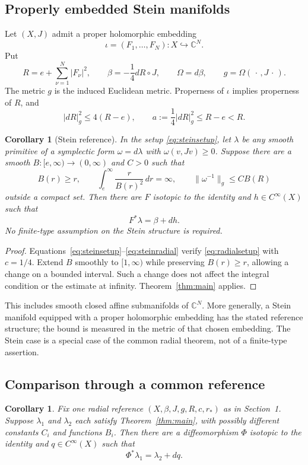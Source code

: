 \documentclass[11pt,a4paper]{article}
\newtheorem{corollary}[theorem]{Corollary}
\theoremstyle{remark}
\newcommand{\C}{\mathbb C}
\newcommand{\abs}[1]{\lvert #1\rvert}
\newcommand{\norm}[1]{\lVert #1\rVert}
\numberwithin{equation}{section}
\begin{document}
\subsection{Properly embedded Stein manifolds}
Let $(X,J)$ admit a proper holomorphic embedding
\[
\iota=(F_1,\ldots,F_N):X\hookrightarrow\C^N.
\]
Put
\begin{equation}\label{eq:steinsetup}
R=e+\sum_{\nu=1}^N\abs{F_\nu}^2,\qquad
\beta=-\frac14dR\circ J,
\qquad \Omega=d\beta,\qquad g=\Omega(\,\cdot\,,J\,\cdot\,).
\end{equation}
The metric $g$ is the induced Euclidean metric. Properness of $\iota$ implies properness of $R$, and
\begin{equation}\label{eq:steinradial}
\abs{dR}_g^2\le4(R-e),\qquad
a:=\frac14\abs{dR}_g^2\le R-e<R.
\end{equation}

\begin{corollary}[Stein reference]\label{cor:stein}
In the setup \eqref{eq:steinsetup}, let $\lambda$ be any smooth primitive of a symplectic form $\omega=d\lambda$ with $\omega(v,Jv)\ge0$. Suppose there are a smooth $B:[e,\infty)\to(0,\infty)$ and $C>0$ such that
\[
B(r)\ge r,\qquad
\int_e^\infty\frac{r}{B(r)^2}\,dr=\infty,
\qquad \norm{\omega^{-1}}_g\le C B(R)
\]
outside a compact set. Then there are $F$ isotopic to the identity and $h\in C^\infty(X)$ such that
\[
F^*\lambda=\beta+dh.
\]
No finite-type assumption on the Stein structure is required.
\end{corollary}

\begin{proof}
Equations~\eqref{eq:steinsetup}--\eqref{eq:steinradial} verify \eqref{eq:radialsetup} with $c=1/4$. Extend $B$ smoothly to $[1,\infty)$ while preserving $B(r)\ge r$, allowing a change on a bounded interval. Such a change does not affect the integral condition or the estimate at infinity. Theorem~\ref{thm:main} applies.
\end{proof}

This includes smooth closed affine submanifolds of $\C^N$. More generally, a Stein manifold equipped with a proper holomorphic embedding has the stated reference structure; the bound is measured in the metric of that chosen embedding. The Stein case is a special case of the common radial theorem, not of a finite-type assertion.

\subsection{Comparison through a common reference}
\begin{corollary}\label{cor:two}
Fix one radial reference $(X,\beta,J,g,R,c,r_*)$ as in Section~1. Suppose $\lambda_1$ and $\lambda_2$ each satisfy Theorem~\ref{thm:main}, with possibly different constants $C_i$ and functions $B_i$. Then there are a diffeomorphism $\Phi$ isotopic to the identity and $q\in C^\infty(X)$ such that
\[
\Phi^*\lambda_1=\lambda_2+dq.
\]
\end{corollary}
\end{document}
